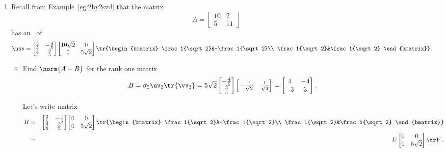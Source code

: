 \begin{example}
\begin{enumerate}
\item Recall from Example~\ref{eg:2by2svd} that the matrix
\begin{equation*}
A=\begin{bmatrix} 10&2\\5&11 \end{bmatrix}
\end{equation*}
has an \svd\ of
\begin{equation*}
\usv=\begin{bmatrix} \frac35&-\frac45\\\frac45&\frac35 \end{bmatrix}
\begin{bmatrix} 10\sqrt2&0\\0&5\sqrt2 \end{bmatrix}
\tr{\begin{bmatrix} \frac1{\sqrt2}&-\frac1{\sqrt2}\\ \frac1{\sqrt2}&\frac1{\sqrt2} \end{bmatrix}}.
\end{equation*}
\begin{itemize}
\item Find \(\norm{A-B}\) for the rank one matrix 
\begin{equation*}
B=\sigma_2\uv_2\tr{\vv_2}
=5\sqrt2\begin{bmatrix} -\frac45\\\frac35 \end{bmatrix}
\begin{bmatrix} -\frac1{\sqrt2}&\frac1{\sqrt2} \end{bmatrix}
=\begin{bmatrix} 4&-4\\-3&3 \end{bmatrix}.
\end{equation*}
\begin{solution} 
Let's write matrix
\begin{eqnarray*}
B&=&\begin{bmatrix} \frac35&-\frac45\\\frac45&\frac35 \end{bmatrix}
\begin{bmatrix} 0&0\\0&5\sqrt2 \end{bmatrix}
\tr{\begin{bmatrix} \frac1{\sqrt2}&-\frac1{\sqrt2}\\ \frac1{\sqrt2}&\frac1{\sqrt2} \end{bmatrix}}
\\&=&U\begin{bmatrix} 0&0\\0&5\sqrt2 \end{bmatrix}\tr V\,.

\end{eqnarray*}
\end{solution}
\end{itemize}
\end{enumerate}
\end{example}
